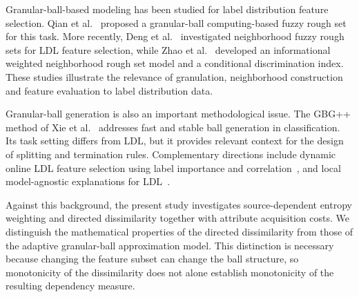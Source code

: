 Granular-ball-based modeling has been studied for label distribution feature
selection. Qian et al.~\cite{Qian2023GBLDL} proposed a granular-ball
computing-based fuzzy rough set for this task. More recently,
Deng et al.~\cite{Deng2025LDNF} investigated neighborhood fuzzy rough sets
for LDL feature selection, while Zhao et al.~\cite{Zhao2026IWNRS} developed
an informational weighted neighborhood rough set model and a conditional
discrimination index. These studies illustrate the relevance of granulation,
neighborhood construction and feature evaluation to label distribution data.

Granular-ball generation is also an important methodological issue.
The GBG++ method of Xie et al.~\cite{Xie2024GBG} addresses fast and stable
ball generation in classification. Its task setting differs from LDL,
but it provides relevant context for the design of splitting and termination
rules. Complementary directions include dynamic online LDL feature selection
using label importance and correlation~\cite{Chen2025OnlineLDL}, and
local model-agnostic explanations for LDL~\cite{Jia2025LIMEFLDL}.

Against this background, the present study investigates source-dependent
entropy weighting and directed dissimilarity together with attribute
acquisition costs. We distinguish the mathematical properties of the directed
dissimilarity from those of the adaptive granular-ball approximation model.
This distinction is necessary because changing the feature subset can change
the ball structure, so monotonicity of the dissimilarity does not alone
establish monotonicity of the resulting dependency measure.
